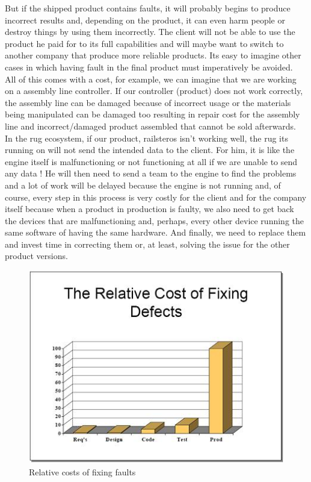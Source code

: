 \documentclass[12pt]{article}
\theoremstyle{definition}
\theoremstyle{definition}
\begin{document}
But if the shipped product contains faults, it will probably begins to produce incorrect results and, depending on the product, it can even harm people or destroy things by using them incorrectly. The client will not be able to use the product he paid for to its full capabilities and will maybe want to switch to another company that produce more reliable products. Its easy to imagine other cases in which having fault in the final product must imperatively be avoided.\\

All of this comes with a cost, for example, we can imagine that we are working on a assembly line controller. If our controller (product) does not work correctly, the assembly line can be damaged because of incorrect usage or the materials being manipulated can be damaged too resulting in repair cost for the assembly line and incorrect/damaged product assembled that cannot be sold afterwards.\\

In the \gls{rug} ecosystem, if our product, \gls{railsteros} isn't working well, the \gls{rug} its running on will not send the intended data to the client. For him, it is like the engine itself is malfunctioning or not functioning at all if we are unable to send any data ! He will then need to send a team to the engine to find the problems and a lot of work will be delayed because the engine is not running and, of course, every step in this process is very costly for the client and for the company itself because when a product in production is faulty, we also need to get back the devices that are malfunctioning and, perhaps, every other device running the same software of having the same hardware. And finally, we need to replace them and invest time in correcting them or, at least, solving the issue for the other product versions.\\

\begin{figure}
    \centering
    \includegraphics[scale=0.8]{STBC-costfixs.jpg}
    \caption{Relative costs of fixing faults~\cite{EconomicsSTBC:2017}}
    \label{STBC-costfixs}
\end{figure}
\end{document}
